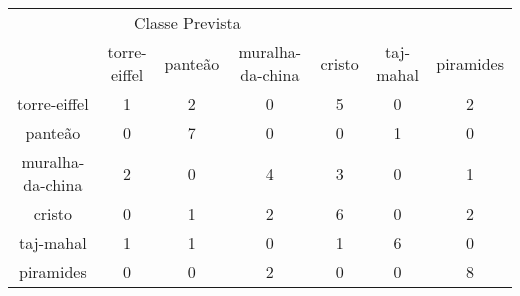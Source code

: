 \begin{tabular}{|c|c|c|c|c|c|c|}
\hline
\multicolumn{5}{|c|}{Classe Prevista}\\
 & torre-eiffel & panteão & muralha-da-china & cristo & taj-mahal & piramides\\
torre-eiffel & 1 & 2 & 0 & 5 & 0 & 2\\
panteão & 0 & 7 & 0 & 0 & 1 & 0\\
muralha-da-china & 2 & 0 & 4 & 3 & 0 & 1\\
cristo & 0 & 1 & 2 & 6 & 0 & 2\\
taj-mahal & 1 & 1 & 0 & 1 & 6 & 0\\
piramides & 0 & 0 & 2 & 0 & 0 & 8\\
\end{tabular}
